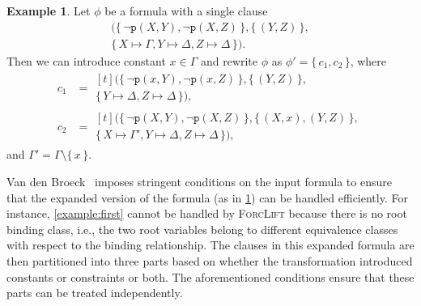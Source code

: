\documentclass{article}
\theoremstyle{definition}
\newtheorem{example}{Example}
\begin{document}
\begin{example}\label{example:dr}
  Let $\phi$ be a formula with a single clause
  \begin{multline*}
    (\{\, \neg \texttt{p}(X, Y), \neg \texttt{p}(X, Z) \,\}, \{\, (Y, Z) \,\}, \\
    \{\, X \mapsto \Gamma, Y \mapsto \Delta, Z \mapsto \Delta \,\}).
  \end{multline*}
  Then we can introduce constant $x \in \Gamma$ and rewrite $\phi$ as
  $\phi' = \{\, c_{1}, c_{2} \,\}$, where
  \begin{align*}
    c_{1} &= \begin{multlined}[t]
      (\{\, \neg \texttt{p}(x, Y), \neg \texttt{p}(x, Z) \,\}, \{\, (Y, Z) \,\}, \\
      \{\, Y \mapsto \Delta, Z \mapsto \Delta \,\}),
      \end{multlined}\\
    c_{2} &= \begin{multlined}[t]
      (\{\, \neg \texttt{p}(X, Y), \neg \texttt{p}(X, Z) \,\}, \{\, (X, x), (Y, Z) \,\}, \\
      \{\, X \mapsto \Gamma', Y \mapsto \Delta, Z \mapsto \Delta \,\}),
      \end{multlined}
  \end{align*}
  and $\Gamma' = \Gamma \setminus \{\, x \,\}$.
\end{example}

Van den Broeck~ imposes stringent conditions
on the input formula to ensure that the expanded version of the formula (as in
\cref{example:dr}) can be handled efficiently. For instance,
\cref{example:first} cannot be handled by \textsc{ForcLift} because there is no
root binding class, i.e., the two root variables belong to different equivalence
classes with respect to the binding relationship. The clauses in this expanded
formula are then partitioned into three parts based on whether the
transformation introduced constants or constraints or both. The aforementioned
conditions ensure that these parts can be treated independently.
\end{document}
